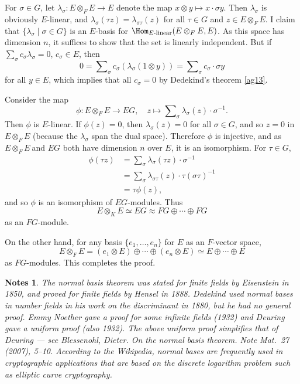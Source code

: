 \documentclass[a4paper,11pt,final,openany]{memoir}
\newtheorem*{nt}{Notes}
\theoremstyle{nonumberplain}
\begin{document}
For $\sigma\in G$, let $\lambda_{\sigma}\colon E\otimes_{F}E\rightarrow E$
denote the map $x\otimes y\mapsto x\cdot\sigma y$. Then $\lambda_{\sigma}$ is
obviously $E$-linear, and $\lambda_{\sigma}(\tau z)=\lambda_{\sigma\tau}(z)$
for all $\tau\in G$ and $z\in E\otimes_{F}E$. I claim that $\{\lambda_{\sigma
}\mid\sigma\in G\}$ is an $E$-basis for $\Hom_{E\text{-linear}}(E\otimes
_{F}E,E)$. As this space has dimension $n$, it suffices to show that the set
is linearly independent. But if $\sum_{\sigma}c_{\sigma}\lambda_{\sigma}=0$,
$c_{\sigma}\in E$, then%
\[
0=\sum\nolimits_{\sigma}c_{\sigma}(\lambda_{\sigma}(1\otimes y))=\sum
\nolimits_{\sigma}c_{\sigma}\cdot\sigma y
\]
for all $y\in E$, which implies that all $c_{\sigma}=0$ by Dedekind's theorem
\ref{ag13}.

Consider the map%
\[
\phi\colon E\otimes_{F}E\rightarrow EG,\quad z\mapsto\sum\nolimits_{\sigma
}\lambda_{\sigma}(z)\cdot\sigma^{-1}.
\]
Then $\phi$ is $E$-linear. If $\phi(z)=0$, then $\lambda_{\sigma}(z)=0$ for
all $\sigma\in G$, and so $z=0$ in $E\otimes_{F}E$ (because the $\lambda
_{\sigma}$ span the dual space). Therefore $\phi$ is injective, and as
$E\otimes_{F}E\ $and $EG$ both have dimension $n$ over $E$, it is an
isomorphism. For $\tau\in G$,%
\begin{align*}
\phi(\tau z)  &  =\sum\nolimits_{\sigma}\lambda_{\sigma}(\tau z)\cdot
\sigma^{-1}\\
&  =\sum\nolimits_{\sigma}\lambda_{\sigma\tau}(z)\cdot\tau(\sigma\tau)^{-1}\\
&  =\tau\phi(z),
\end{align*}
and so $\phi$ is an isomorphism of $EG$-modules. Thus%
\[
E\otimes_{K}E\simeq EG\approx FG\oplus\cdots\oplus FG
\]
as an $FG$-module.

On the other hand, for any basis $\{e_{1},\ldots,e_{n}\}$ for $E$ as an
$F$-vector space,
\[
E\otimes_{F}E=(e_{1}\otimes E)\oplus\cdots\oplus(e_{n}\otimes E)\simeq
E\oplus\cdots\oplus E
\]
as $FG$-modules. This completes the proof.

\begin{nt}
The normal basis theorem was stated for finite fields by Eisenstein in 1850,
and proved for finite fields by Hensel in 1888. Dedekind used normal bases in
number fields in his work on the discriminant in 1880, but he had no general
proof. Emmy Noether gave a proof for some infinite fields (1932) and Deuring
gave a uniform proof (also 1932). The above uniform proof simplifies that of
Deuring --- see Blessenohl, Dieter. On the normal basis theorem. Note Mat.~27
(2007), 5--10. According to the Wikipedia, normal bases are frequently used in
cryptographic applications that are based on the discrete logarithm problem
such as elliptic curve cryptography.
\end{nt}
\end{document}
